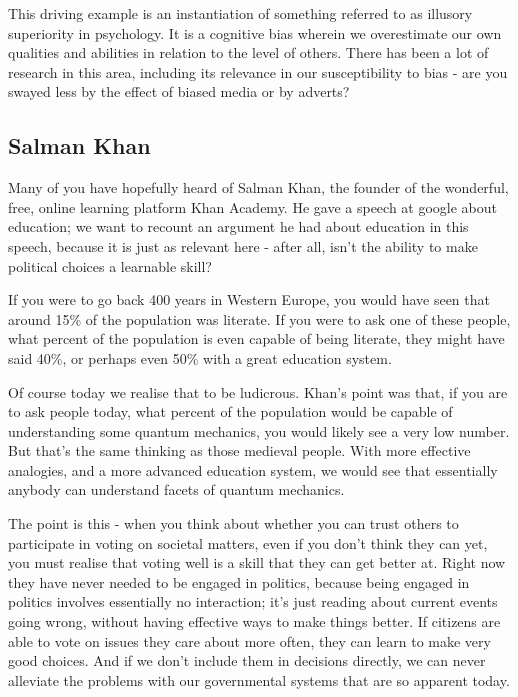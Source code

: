 \documentclass[twoside]{article}
\theoremstyle{definition}
\begin{document}
This driving example is an instantiation of something referred to as illusory superiority in psychology. It is a cognitive bias wherein we overestimate our own qualities and abilities in relation to the level of others. There has been a lot of research in this area, including its relevance in our susceptibility to bias - are you swayed less by the effect of biased media or by adverts?

\subsection{Salman Khan}

Many of you have hopefully heard of Salman Khan, the founder of the wonderful, free, online learning platform Khan Academy. He gave a speech at google about education; we want to recount an argument he had about education in this speech, because it is just as relevant here - after all, isn’t the ability to make political choices a learnable skill?

If you were to go back 400 years in Western Europe, you would have seen that around 15\% of the population was literate. If you were to ask one of these people, what percent of the population is even capable of being literate, they might have said 40\%, or perhaps even 50\% with a great education system. 

Of course today we realise that to be ludicrous. Khan’s point was that, if you are to ask people today, what percent of the population would be capable of understanding some quantum mechanics, you would likely see a very low number. But that’s the same thinking as those medieval people. With more effective analogies, and a more advanced education system, we would see that essentially anybody can understand facets of quantum mechanics.

The point is this - when you think about whether you can trust others to participate in voting on societal matters, even if you don’t think they can yet, you must realise that voting well is a skill that they can get better at. Right now they have never needed to be engaged in politics, because being engaged in politics involves essentially no interaction; it’s just reading about current events going wrong, without having effective ways to make things better. If citizens are able to vote on issues they care about more often, they can learn to make very good choices. And if we don’t include them in decisions directly, we can never alleviate the problems with our governmental systems that are so apparent today.
\end{document}

